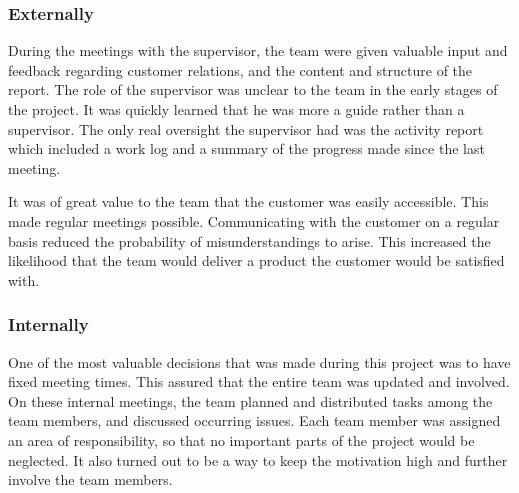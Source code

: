 \subsubsection{Externally}
During the meetings with the supervisor, the team were given valuable input and feedback regarding customer relations, and the content and structure of the report. The role of the supervisor was unclear to the team in the early stages of the project. It was quickly learned that he was more a guide rather than a supervisor. The only real oversight the supervisor had was the activity report which included a work log and a summary of the progress made since the last meeting.

It was of great value to the team that the customer was easily accessible. This made regular meetings possible. Communicating with the customer on a regular basis reduced the probability of misunderstandings to arise. This increased the likelihood that the team would deliver a product the customer would be satisfied with.
 
\subsubsection{Internally}
One of the most valuable decisions that was made during this project was to have fixed meeting times. This assured that the entire team was updated and involved. On these internal meetings, the team planned and distributed tasks among the team members, and discussed occurring issues. Each team member was assigned an area of responsibility, so that no important parts of the project would be neglected. It also turned out to be a way to keep the motivation high and further involve the team members.


